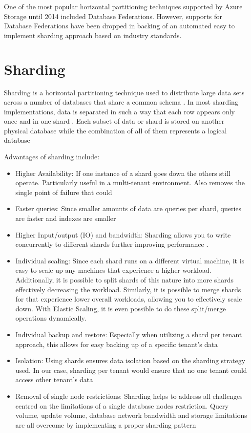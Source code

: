 One of the most popular horizontal partitioning techniques supported by Azure Storage until 2014 included Database Federations. However, supports for Database Federations have been dropped in backing of an automated easy to implement sharding approach based on industry standards.

\section{Sharding}

Sharding is a horizontal partitioning technique used to distribute large data sets across a number of databases that share a common schema \cite{Microsoft_Corporation_undated-ej}. In most sharding implementations, data is separated in such a way that each row appears only once and in one shard \cite{Wilder2012-so}. Each subset of data or shard is stored on another physical database while the combination of all of them represents a logical database \cite{Wilder2012-so}
 
Advantages of sharding include:
\begin{itemize}
\item Higher Availability: If one instance of a shard goes down the others still operate. Particularly useful in a multi-tenant environment. Also removes the single point of failure that could
\item Faster queries: Since smaller amounts of data are queries per shard, queries are faster and indexes are smaller
\item Higher Input/output (IO) and bandwidth: Sharding allows you to write concurrently to different shards further improving performance \cite{Rahul2008-vo}.
\item Individual scaling: Since each shard runs on a different virtual machine, it is easy to scale up any machines that experience a higher workload. Additionally, it is possible to split shards of this nature into more shards effectively decreasing the workload. Similarly, it is possible to merge shards for that experience lower overall workloads, allowing you to effectively scale down. With Elastic Scaling, it is even possible to do these split/merge operations dynamically.
\item Individual backup and restore: Especially when utilizing a shard per tenant approach, this allows for easy backing up of a specific tenant's data
\item Isolation: Using shards ensures data isolation based on the sharding strategy used. In our case, sharding per tenant would ensure that no one tenant could access other tenant's data
\item Removal of single node restrictions: Sharding helps to address all challenges centred on the limitations of a single database nodes restriction. Query volume, update volume, database network bandwidth and storage limitations are all overcome by implementing a proper sharding pattern \cite{Wilder2012-so}
 \end{itemize}
 
